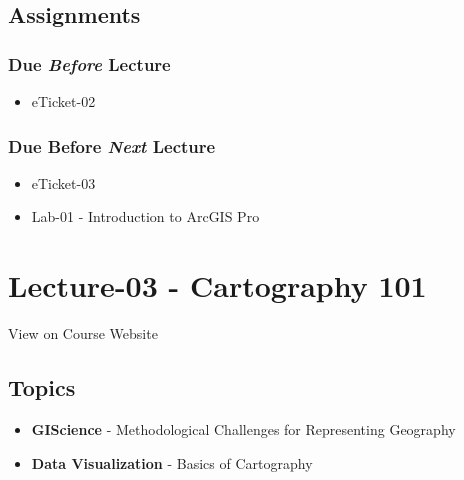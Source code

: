 \documentclass[
]{book}
\providecommand{\tightlist}{%
  \setlength{\itemsep}{0pt}\setlength{\parskip}{0pt}}
\begin{document}
\hypertarget{assignments-3}{%
\subsection*{Assignments}\label{assignments-3}}

\hypertarget{due-before-lecture-1}{%
\subsubsection*{\texorpdfstring{Due \emph{Before} Lecture}{Due Before Lecture}}\label{due-before-lecture-1}}

\begin{itemize}
\tightlist
\item
  eTicket-02
\end{itemize}

\hypertarget{due-before-next-lecture}{%
\subsubsection*{\texorpdfstring{Due Before \emph{Next} Lecture}{Due Before Next Lecture}}\label{due-before-next-lecture}}

\begin{itemize}
\tightlist
\item
  eTicket-03
\item
  Lab-01 - Introduction to ArcGIS Pro
\end{itemize}

\hypertarget{lecture-03---cartography-101}{%
\section*{Lecture-03 - Cartography 101}\label{lecture-03---cartography-101}}

View on Course Website

\hypertarget{topics-3}{%
\subsection*{Topics}\label{topics-3}}

\begin{itemize}
\tightlist
\item
  \textbf{GIScience} - Methodological Challenges for Representing Geography
\item
  \textbf{Data Visualization} - Basics of Cartography
\end{itemize}
\end{document}
